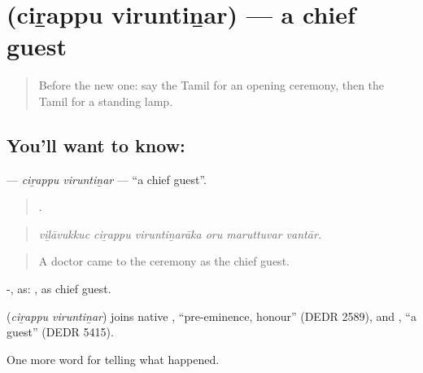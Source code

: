 \section[\texorpdfstring{\ta{சிறப்பு} \ta{விருந்தினர்} (ciṟappu viruntiṉar)}{சிறப்பு விருந்தினர் (ciṟappu viruntiṉar)}]{  (ciṟappu viruntiṉar) — a chief guest}

\label{lesson:TA-C318-cirappu-viruntinar}



\begin{quote}
Before the new one: say the Tamil for an opening ceremony, then the Tamil for a standing lamp.
\end{quote}

\subsection*{You'll want to know:  }
\textbf{ } — \emph{ciṟappu viruntiṉar} — \textquotedblleft{}a chief guest\textquotedblright{}.

\begin{quote}
     .
\end{quote}

\begin{quote}
\emph{viḻāvukkuc ciṟappu viruntiṉarāka oru maruttuvar vantār.}
\end{quote}

\begin{quote}
A doctor came to the ceremony as the chief guest.
\end{quote}

-, as:  , as chief guest.

\begin{cousinweb}
\textbf{ } (\emph{ciṟappu viruntiṉar}) joins native , \textquotedblleft{}pre-eminence, honour\textquotedblright{} (DEDR 2589), and , \textquotedblleft{}a guest\textquotedblright{} (DEDR 5415).
\end{cousinweb}

\begin{grammarlens}[title={What you've built}]
One more word for telling what happened.
\end{grammarlens}

